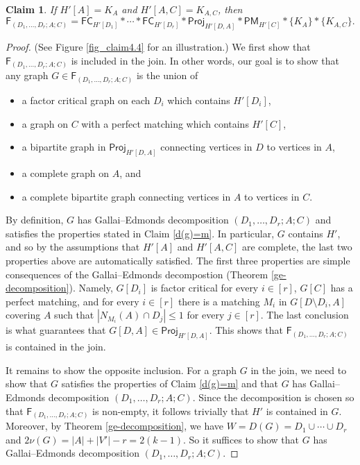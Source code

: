 \documentclass[10pt]{amsart}
\newtheorem{claim}[thm]{Claim}
\theoremstyle{definition}
\begin{document}
	\begin{claim} \label{join structure}
		If $H'[A] = K_A$ and $H'[A,C] = K_{A,C}$, then  \[\mathsf{F}_{(D_1, \dots, D_r;A;C)} = \mathsf{FC}_{H'[D_1]} * \cdots * \mathsf{FC}_{H'[D_r]} * \mathsf{Proj}_{H'[D,A]} * \mathsf{PM}_{H'[C]} * \{K_A\} * \{K_{A,C}\}.\]
	\end{claim}
	\begin{proof}
		(See Figure \ref{fig_claim4.4} for an illustration.) We first show  that $\mathsf{F}_{(D_1, \dots, D_r;A;C)}$ is included in the join.
		In other words, our goal is to show that any  graph $G\in \mathsf{F}_{(D_1 ,\dots,D_r ;A;C)}$ is the union of 
		\begin{itemize}
			\item a factor critical graph on each $D_i$ which contains $H'[D_i]$,
			\item a graph on $C$ with a perfect matching which  contains $H'[C]$,
			\item a bipartite graph in $\mathsf{Proj}_{H'[D,A]}$ connecting vertices in $D$ to vertices in $A$,
			\item a complete graph on $A$, and
			\item a complete bipartite graph connecting vertices in $A$ to vertices in $C$.
		\end{itemize}
		By definition, $G$ has Gallai--Edmonds decomposition $(D_1, \dots, D_r ; A; C)$ and satisfies the properties stated in Claim \ref{d(g)=m}. In particular, $G$ contains $H'$, and so by the assumptions that $H'[A]$ and $H'[A,C]$ are complete, the last two properties above are automatically satisfied. The first three properties are simple consequences of the Gallai--Edmonds decompostion (Theorem \ref{ge-decomposition}). Namely, 
		$G[D_i]$ is factor critical for every $i\in [r]$, $G[C]$ has a perfect matching, and for every $i\in [r]$ there is a matching $M_i$ in $G[D\setminus D_i, A]$ covering $A$ such that $|N_{M_i}(A) \cap D_j|\leq 1$ for every $j\in [r]$. The last conclusion is what guarantees that $G[D,A] \in \mathsf{Proj}_{H'[D,A]}$. This shows that $\mathsf{F}_{(D_1, \dots, D_r;A;C)}$ is contained in the join.
		
		\smallskip
		
		It remains to show the opposite inclusion. For a graph $G$ in the join, we need to show that $G$ satisfies the properties of Claim \ref{d(g)=m} and that $G$ has Gallai--Edmonds decomposition $(D_1, \dots, D_r ; A; C)$. 
		Since the decomposition is chosen so that $\mathsf{F}_{(D_1, \dots, D_r ; A; C)}$ is non-empty, it follows trivially that 
		$H'$ is contained in $G$. Moreover, by Theorem \ref{ge-decomposition}, we have  $W=D(G) = D_1 \cup \cdots \cup D_r$ and $2\nu(G) = |A|+|V'|-r=2(k-1)$. So it suffices to show  that $G$ has Gallai--Edmonds decomposition $(D_1, \dots, D_r ; A; C)$. 
		

\end{proof}
\end{document}
